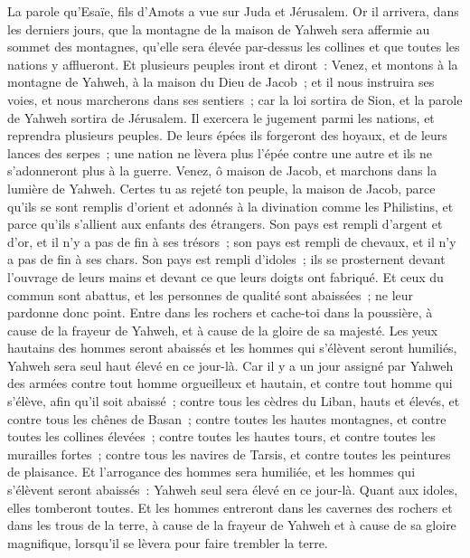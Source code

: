 \begin{multicols}{2}
\VerseOne{}La parole qu'Esaïe, fils d'Amots a vue sur Juda et Jérusalem.
Or il arrivera, dans les derniers jours, que la montagne de la maison de Yahweh sera affermie au sommet des montagnes, qu'elle sera élevée par-dessus les collines et que toutes les nations y afflueront.
Et plusieurs peuples iront et diront~: Venez, et montons à la montagne de Yahweh, à la maison du Dieu de Jacob~; et il nous instruira ses voies, et nous marcherons dans ses sentiers~; car la loi sortira de Sion, et la parole de Yahweh sortira de Jérusalem. 
Il exercera le jugement parmi les nations, et reprendra plusieurs peuples. De leurs épées ils forgeront des hoyaux, et de leurs lances des serpes~; une nation ne lèvera plus l'épée contre une autre et ils ne s'adonneront plus à la guerre.
Venez, ô maison de Jacob, et marchons dans la lumière de Yahweh.
Certes tu as rejeté ton peuple, la maison de Jacob, parce qu'ils se sont remplis d'orient et adonnés à la divination comme les Philistins, et parce qu'ils s'allient aux enfants des étrangers.
Son pays est rempli d'argent et d'or, et il n'y a pas de fin à ses trésors~; son pays est rempli de chevaux, et il n'y a pas de fin à ses chars.
Son pays est rempli d'idoles~; ils se prosternent devant l'ouvrage de leurs mains et devant ce que leurs doigts ont fabriqué.
Et ceux du commun sont abattus, et les personnes de qualité sont abaissées~; ne leur pardonne donc point.
Entre dans les rochers et cache-toi dans la poussière, à cause de la frayeur de Yahweh, et à cause de la gloire de sa majesté.
Les yeux hautains des hommes seront abaissés et les hommes qui s'élèvent seront humiliés, Yahweh sera seul haut élevé en ce jour-là.
Car il y a un jour assigné par Yahweh des armées contre tout homme orgueilleux et hautain, et contre tout homme qui s'élève, afin qu'il soit abaissé~;
contre tous les cèdres du Liban, hauts et élevés, et contre tous les chênes de Basan~;
contre toutes les hautes montagnes, et contre toutes les collines élevées~;
contre toutes les hautes tours, et contre toutes les murailles fortes~;
contre tous les navires de Tarsis, et contre toutes les peintures de plaisance.
Et l'arrogance des hommes sera humiliée, et les hommes qui s'élèvent seront abaissés~:
Yahweh seul sera élevé en ce jour-là. Quant aux idoles, elles tomberont toutes.
Et les hommes entreront dans les cavernes des rochers et dans les trous de la terre, à cause de la frayeur de Yahweh et à cause de sa gloire magnifique, lorsqu'il se lèvera pour faire trembler la terre.

\end{multicols}

